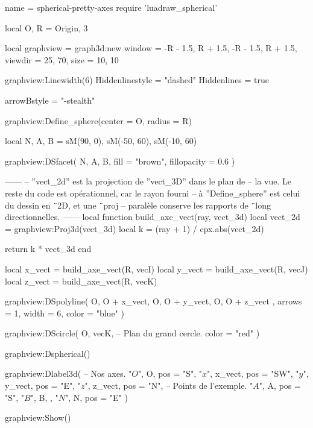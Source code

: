 \documentclass{standalone}
\begin{document}
\begin{luadraw}{name = spherical-pretty-axes}
require 'luadraw_spherical'

local O, R = Origin, 3

local graphview = graph3d:new{
  window  = {-R - 1.5, R + 1.5, -R - 1.5, R + 1.5},
  viewdir = {25, 70},
  size    = {10, 10}
}

graphview:Linewidth(6)
Hiddenlinestyle = "dashed"
Hiddenlines     = true

arrowBstyle = "-stealth"

graphview:Define_sphere({center = O, radius = R})

local N, A, B = sM(90, 0), sM(-50, 60), sM(-10, 60)

graphview:DSfacet(
  {N, A, B},
  {fill = "brown", fillopacity = 0.6}
)

------
-- ''vect_2d'' est la projection de ''vect_3D'' dans le plan de
-- la vue. Le reste du code est opérationnel, car le rayon fourni
-- à ''Define_sphere'' est celui du dessin en ¨2D, et une ¨proj
-- paralèle conserve les rapports de ¨long directionnelles.
------
local function build_axe_vect(ray, vect_3d)
  local vect_2d = graphview:Proj3d(vect_3d)
  local k       = (ray + 1) / cpx.abs(vect_2d)

  return k * vect_3d
end

local x_vect = build_axe_vect(R, vecI)
local y_vect = build_axe_vect(R, vecJ)
local z_vect = build_axe_vect(R, vecK)

graphview:DSpolyline(
  {
    {O, O + x_vect},
    {O, O + y_vect},
    {O, O + z_vect}
  },
  {arrows = 1, width = 6, color = "blue"}
)

graphview:DScircle(
  {O, vecK},       -- Plan du grand cercle.
  {color = "red"}
)

graphview:Dspherical()

graphview:Dlabel3d(
-- Nos axes.
  "$O$", O, {pos = "S"},
  "$x$", x_vect, {pos = "SW"},
  "$y$", y_vect, {pos = "E"},
  "$z$", z_vect, {pos = "N"},
-- Points de l'exemple.
  "$A$", A, {pos = "S"},
  "$B$", B, {},
  "$N$", N, {pos = "E"}
)

graphview:Show()
\end{luadraw}
\end{document}
